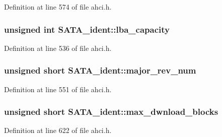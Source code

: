 Definition at line 574 of file ahci.\+h.

\subsubsection[{\texorpdfstring{lba\+\_\+capacity}{lba_capacity}}]{\setlength{\rightskip}{0pt plus 5cm}unsigned int S\+A\+T\+A\+\_\+ident\+::lba\+\_\+capacity}\hypertarget{structSATA__ident_acd8bcb50bbcde8afa6b790e733569563}{}\label{structSATA__ident_acd8bcb50bbcde8afa6b790e733569563}


Definition at line 536 of file ahci.\+h.

\subsubsection[{\texorpdfstring{major\+\_\+rev\+\_\+num}{major_rev_num}}]{\setlength{\rightskip}{0pt plus 5cm}unsigned short S\+A\+T\+A\+\_\+ident\+::major\+\_\+rev\+\_\+num}\hypertarget{structSATA__ident_a20072f19c069ac7fd06c1b1b35cac9cf}{}\label{structSATA__ident_a20072f19c069ac7fd06c1b1b35cac9cf}


Definition at line 551 of file ahci.\+h.

\subsubsection[{\texorpdfstring{max\+\_\+dwnload\+\_\+blocks}{max_dwnload_blocks}}]{\setlength{\rightskip}{0pt plus 5cm}unsigned short S\+A\+T\+A\+\_\+ident\+::max\+\_\+dwnload\+\_\+blocks}\hypertarget{structSATA__ident_a93c778d7e7521c8e84682c52c8e5dc6e}{}\label{structSATA__ident_a93c778d7e7521c8e84682c52c8e5dc6e}


Definition at line 622 of file ahci.\+h.

